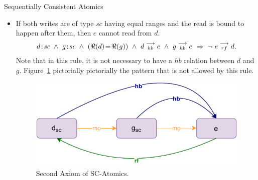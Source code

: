 \begin{axiom}{Sequentially Consistent Atomics}
\begin{itemize}
                \item If both writes are of type $sc$ having equal ranges and the read is bound to happen after them, then $e$ cannot read from $d$. 
                    \begin{align*}
                        d\!:\!\textit{sc}\ \wedge\ g\!:\!\textit{sc}  
                        \ \wedge \ (\Re(d) \!=\! \Re(g)) 
                        \ \wedge \ d\stackrel{\longrightarrow}{_{hb}}e
                        \ \wedge \ g\stackrel{\longrightarrow}{_{hb}}e
                        \ \Rightarrow{}\  
                        \neg \ e\stackrel{\longrightarrow}{_{rf}}d.
                    \end{align*}
                    Note that in this rule, it is not necessary to have a $hb$ relation between $d$ and $g$.
                    Figure~\ref{model:sc_atomics(2)} pictorially pictorially the pattern that is not allowed by this rule.
                    \begin{figure}[H]
                        \centering 
                        \includegraphics[scale=0.7]{3.ECMAScriptMemoryModel/SequentialAtomics3.pdf}
                        \caption{Second Axiom of SC-Atomics.}
                        \label{model:sc_atomics(2)}
                    \end{figure}
                

\end{itemize}
\end{axiom}
